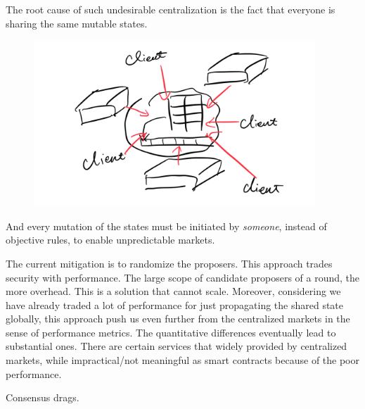 The root cause of such undesirable centralization is the fact that everyone is sharing the same mutable states.

\begin{figure}[H]
    \includegraphics[width=300pt]{graphs/IMG_0061}
    \Description{}
\end{figure}

And every mutation of the states must be initiated by \emph{someone}, instead of objective rules, to enable unpredictable markets.

The current mitigation is to randomize the proposers.
This approach trades security with performance.
The large scope of candidate proposers of a round, the more overhead.
This is a solution that cannot scale.
Moreover, considering we have already traded a lot of performance for just propagating the shared state globally, this approach push us even further from the centralized markets in the sense of performance metrics.
The quantitative differences eventually lead to substantial ones.
There are certain services that widely provided by centralized markets, while impractical/not meaningful as smart contracts because of the poor performance.

Consensus drags.